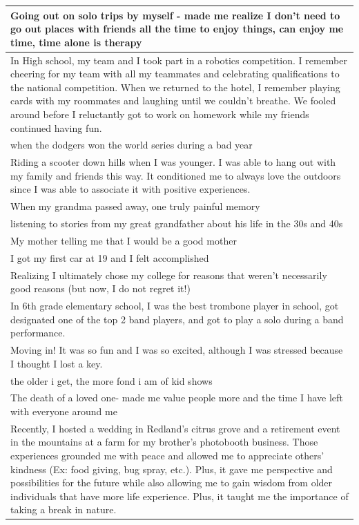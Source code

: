 \documentclass[
  .7em,
  letterpaper,
  DIV=11,
  numbers=noendperiod]{scrartcl}
\begin{document}
\begin{table}
\begin{tabular}{l}
Going out on solo trips by myself - made me realize I don't need to go out places with friends all the time to enjoy things, can enjoy me time, time alone is therapy\\
\hline
In High school, my team and I took part in a robotics competition. I remember cheering for my team with all my teammates and celebrating qualifications to the national competition. When we returned to the hotel, I remember playing cards with my roommates and laughing until we couldn’t breathe. We fooled around before I reluctantly got to work on homework while my friends continued having fun.\\
\hline
when the dodgers won the world series during a bad year\\
\hline
Riding a scooter down hills when I was younger. I was able to hang out with my family and friends this way. It conditioned me to always love the outdoors since I was able to associate it with positive experiences.\\
\hline
When my grandma passed away, one truly painful memory\\
\hline
listening to stories from my great grandfather about his life in the 30s and 40s\\
\hline
My mother telling me that I would be a good mother\\
\hline
I got my first car at 19 and I felt accomplished\\
\hline
Realizing I ultimately chose my college for reasons that weren’t necessarily good reasons (but now, I do not regret it!)\\
\hline
In 6th grade elementary school, I was the best trombone player in school, got designated one of the top 2 band players, and got to play a solo during a band performance.\\
\hline
Moving in! It was so fun and I was so excited, although I was stressed because I thought I lost a key.\\
\hline
the older i get, the more fond i am of kid shows\\
\hline
The death of a loved one- made me value people more and the time I have left with everyone around me\\
\hline
Recently, I hosted a wedding in Redland's citrus grove and a retirement event in the mountains at a farm for my brother's photobooth business. Those experiences grounded me with peace and allowed me to appreciate others' kindness (Ex: food giving, bug spray, etc.). Plus, it gave me perspective and possibilities for the future while also allowing me to gain wisdom from older individuals that have more life experience. Plus, it taught me the importance of taking a break in nature.\\

\end{tabular}
\end{table}
\end{document}
